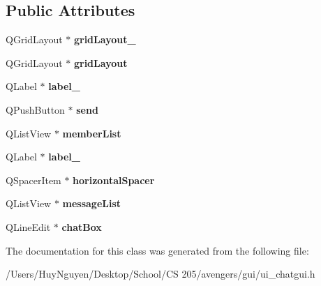 \subsection*{Public Attributes}
\begin{DoxyCompactItemize}
\item 
Q\+Grid\+Layout $\ast$ {\bfseries grid\+Layout\+\_}\hypertarget{classUi__ChatGUI_a5c3f0775f452be36bae8b962c239aa95}{}\label{classUi__ChatGUI_a5c3f0775f452be36bae8b962c239aa95}

\item 
Q\+Grid\+Layout $\ast$ {\bfseries grid\+Layout}\hypertarget{classUi__ChatGUI_a5f9505befd199d6926f5af41935c58a9}{}\label{classUi__ChatGUI_a5f9505befd199d6926f5af41935c58a9}

\item 
Q\+Label $\ast$ {\bfseries label\+\_}\hypertarget{classUi__ChatGUI_a950eb87191e8253a7ebca9f9ab536719}{}\label{classUi__ChatGUI_a950eb87191e8253a7ebca9f9ab536719}

\item 
Q\+Push\+Button $\ast$ {\bfseries send}\hypertarget{classUi__ChatGUI_a116c5cae87d4488f9ea2c710d97c9d3f}{}\label{classUi__ChatGUI_a116c5cae87d4488f9ea2c710d97c9d3f}

\item 
Q\+List\+View $\ast$ {\bfseries member\+List}\hypertarget{classUi__ChatGUI_ab75693a3681cf09e8e21feef72b38a90}{}\label{classUi__ChatGUI_ab75693a3681cf09e8e21feef72b38a90}

\item 
Q\+Label $\ast$ {\bfseries label\+\_}\hypertarget{classUi__ChatGUI_a7fdeadc9a2dfcd916ce4f45df1092dd8}{}\label{classUi__ChatGUI_a7fdeadc9a2dfcd916ce4f45df1092dd8}

\item 
Q\+Spacer\+Item $\ast$ {\bfseries horizontal\+Spacer}\hypertarget{classUi__ChatGUI_a598c054c05c1ba4bb12ba6a0be29e559}{}\label{classUi__ChatGUI_a598c054c05c1ba4bb12ba6a0be29e559}

\item 
Q\+List\+View $\ast$ {\bfseries message\+List}\hypertarget{classUi__ChatGUI_aa3ee6470e336d7b40faf94b88e198c27}{}\label{classUi__ChatGUI_aa3ee6470e336d7b40faf94b88e198c27}

\item 
Q\+Line\+Edit $\ast$ {\bfseries chat\+Box}\hypertarget{classUi__ChatGUI_a9c0f911a1b6ab766612c2837e875fbf5}{}\label{classUi__ChatGUI_a9c0f911a1b6ab766612c2837e875fbf5}

\end{DoxyCompactItemize}


The documentation for this class was generated from the following file\+:\begin{DoxyCompactItemize}
\item 
/\+Users/\+Huy\+Nguyen/\+Desktop/\+School/\+C\+S 205/avengers/gui/ui\+\_\+chatgui.\+h\end{DoxyCompactItemize}
